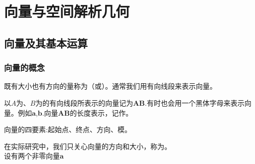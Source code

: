 \chapter{向量与空间解析几何}
\section{向量及其基本运算}
\subsection{向量的概念}
既有大小也有方向的量称为（或）。通常我们用有向线段来表示向量。
\par 以$A$为、$B$为的有向线段所表示的向量记为$\boldsymbol{AB}$.有时也会用一个黑体字母来表示向量。例如$\boldsymbol{a}$,$\boldsymbol{b}$.向量$\boldsymbol{AB}$的长度表示，记作。
\par 向量的四要素:起始点、终点、方向、模。

在实际研究中，我们只关心向量的方向和大小，称为。\\

\sj
{}
设有两个非零向量$\boldsymbol{a}$
